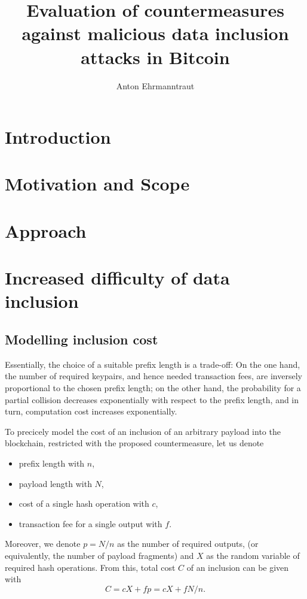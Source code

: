 \documentclass[10pt,a4paper,twocolumn]{article}
\title{Evaluation of countermeasures against malicious data inclusion attacks in Bitcoin}
\author{Anton Ehrmanntraut}
\renewenvironment{abstract}
{\begin{quote}
\noindent {\bfseries \abstractname.}}
{\end{quote}
}
\begin{document}
\maketitle
\begin{abstract}
\end{abstract}

\section{Introduction}

\section{Motivation and Scope}


\section{Approach}

\section{Increased difficulty of data inclusion}


\subsection{Modelling inclusion cost}

Essentially, the choice of a suitable prefix length is a trade-off:
On the one hand, the number of required keypairs, and hence needed transaction fees, are inversely proportional to the chosen prefix length;
on the other hand, the probability for a partial collision decreases exponentially with respect to the prefix length, and in turn, computation cost increases exponentially.

To precicely model the cost of an inclusion of an arbitrary payload into the blockchain, restricted with the proposed countermeasure, let us denote 
\begin{itemize}
    \item prefix length with $n$,
    \item payload length with $N$,
    \item cost of a single hash operation with $c$,
    \item transaction fee for a single output with $f$.
\end{itemize}
Moreover, we denote $p=N/n$ as the number of required outputs, (or equivalently, the number of payload fragments) and $X$ as the random variable of required hash operations.
From this, total cost $C$ of an inclusion can be given with
\[ C =  c X + fp = c X + fN/n . \]
\end{document}
